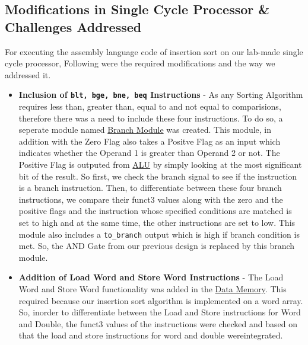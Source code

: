 \documentclass[12pt]{article}
\begin{document}
\subsection*{\Large Modifications in Single Cycle Processor \& Challenges Addressed}
For executing the assembly language code of insertion sort on our lab-made single cycle processor, Following were the required modifications and the way we addressed it.
\begin{itemize}
    \item \textbf{Inclusion of \texttt{blt, bge, bne, beq} Instructions} - As any Sorting Algorithm requires less than, greater than, equal to and not equal to comparisions, therefore there was a need to include these four instructions. To do so, a seperate module named \hyperref[branch_module]{Branch Module} was created. This module, in addition with the Zero Flag also takes a Positve Flag as an input which indicates whether the Operand 1 is greater than Operand 2 or not. The Positive Flag is outputed from \hyperref[alu]{ALU} by simply looking at the most significant bit of the result. So first, we check the branch signal to see if the instruction is a branch instruction. Then, to differentiate between these four branch instructions, we compare their funct3 values along with the zero and the positive flags and the instruction whose specified conditions are matched is set to high and at the same time, the other instructions are set to low. This module also includes a \texttt{to\_branch} output which is high if branch condition is met. So, the AND Gate from our previous design is replaced by this branch module.
    \item \textbf{Addition of Load Word and Store Word Instructions} - The Load Word and Store Word functionality was added in the \hyperref[dmem]{Data Memory}. This required because our insertion sort algorithm is implemented on a word array. So, inorder to differentiate between the Load and Store instructions for Word and Double, the funct3 values of the instructions were checked and based on that the load and store instructions for word and double wereintegrated.
\end{itemize}
\end{document}
